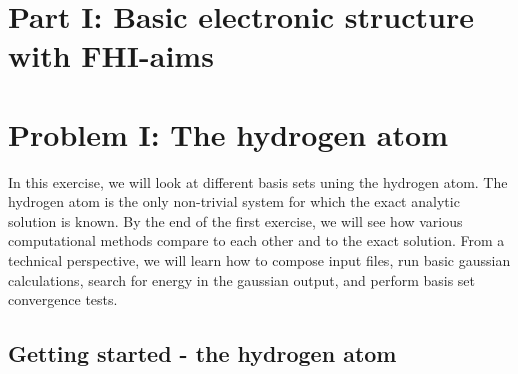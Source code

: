 \section*{Part I:  Basic electronic structure with FHI-aims}\label{sec:partI}

\section{Problem I: The hydrogen atom} \label{sec:problemI}

In this exercise, we will look at different basis sets uning the hydrogen atom. The hydrogen atom is the only non-trivial system for which the exact analytic solution is known. 
By the end of the first exercise, we will see how various computational methods compare to each other and to the exact solution.  
From a technical perspective, we will learn how to compose input files, run basic gaussian calculations, search for energy in the gaussian output, and perform basis set convergence tests.

\subsection*{Getting started - the hydrogen atom}
%




